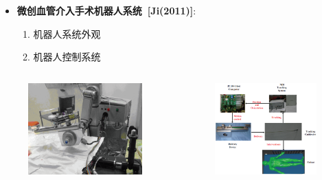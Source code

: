 \begin{frame}
\begin{itemize}
  \item \textbf{微创血管介入手术机器人系统~[Ji(2011)]}: 
  \begin{enumerate}
     \item 机器人系统外观
    \item 机器人控制系统
  \end{enumerate}
\end{itemize}
\begin{columns}[b,onlytextwidth]
\begin{column}{.5\textwidth}
\begin{figure}[t]
\centering
\includegraphics[height=100pt]{../../Figures/background/robot.eps}
\end{figure}
\end{column}
\begin{column}{.5\textwidth}
 \begin{figure}[t]
\centering
\includegraphics[height=100pt]{../../Figures/background/robot_arch.eps}
\end{figure}
\end{column}
\end{columns}
\end{frame}

